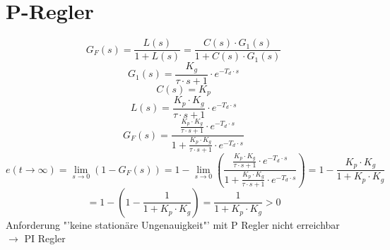 \section{P-Regler}
\[ G_F(s) = \frac{L(s)}{1 + L(s)} = \frac{C(s) \cdot G_1(s)}{1 + C(s) \cdot G_1(s)} \]
\[ G_1(s) = \frac{K_g}{\tau \cdot s + 1} \cdot e^{-T_d \cdot s} \]
\[ C(s) = K_p \]
\[ L(s) = \frac{K_p \cdot K_g}{\tau \cdot s + 1} \cdot e^{-T_d \cdot s} \]
\[ G_F(s) = \frac{\frac{K_p \cdot K_g}{\tau \cdot s + 1} \cdot e^{-T_d \cdot s}}
    {1 + \frac{K_p \cdot K_g}{\tau \cdot s + 1} \cdot e^{-T_d \cdot s}}
\]
\[ e(t \to \infty) = \lim\limits_{s \to 0} (1 - G_F(s))
    = 1 - \lim\limits_{s \to 0} \left(\frac{\frac{K_p \cdot K_g}{\tau \cdot s + 1} \cdot e^{-T_d \cdot s}}
        {1 + \frac{K_p \cdot K_g}{\tau \cdot s + 1} \cdot e^{-T_d \cdot s}}\right)
    = 1 - \frac{K_p \cdot K_g}{1 + K_p \cdot K_g}
\]
\[
    = 1 - \left(1 - \frac{1}{1 + K_p \cdot K_g}\right)
    = \frac{1}{1 + K_p \cdot K_g} > 0
\]
Anforderung "'keine stationäre Ungenauigkeit"' mit P Regler nicht erreichbar \\
$\rightarrow$ PI Regler
